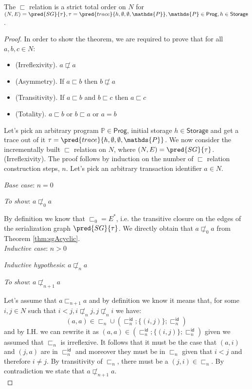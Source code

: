 \thm The $\sqsubset$ relation is a strict total order on $N$ for $(N, E) = \pred{SG}{\tau}, \tau = \pred{trace}{h, \emptyset, \emptyset, \mathds{P}}, \mathds{P} \in \mathsf{Prog}, h \in \mathsf{Storage}$.

\begin{proof}
In order to show the theorem, we are required to prove that for all $a, b, c \in N$:
\begin{itemize}
	\item (Irreflexivity). $a \not\sqsubset a$
	\item (Asymmetry). If $a \sqsubset b$ then $b \not\sqsubset a$
	\item (Transitivity). If $a \sqsubset b$ and $b \sqsubset c$ then $a \sqsubset c$
	\item (Totality). $a \sqsubset b$ or $b \sqsubset a$ or $a = b$
\end{itemize}

Let's pick an arbitrary program $\mathds{P} \in \mathsf{Prog}$, initial storage $h \in \mathsf{Storage}$ and get a trace out of it $\tau = \pred{trace}{h, \emptyset, \emptyset, \mathds{P}}$. We now consider the incrementally built $\sqsubset$ relation on $N$, where $(N, E) = \pred{SG}{\tau}$. \\

(Irreflexivity). The proof follows by induction on the number of $\sqsubset$ relation construction steps, $n$. Let's pick an arbitrary transaction identifier $a \in N$.

{\parindent0pt
\textit{Base case}: $n = 0$

\textit{To show}: $a \not\sqsubset_0 a$

By definition we know that $\sqsubset_0 = E^*$, i.e. the transitive closure on the edges of the serialization graph $\pred{SG}{\tau}$. We directly obtain that $a \not\sqsubset_0 a$ from Theorem \ref{thm:sgAcyclic}. \\

\textit{Inductive case}: $n > 0$

\textit{Inductive hypothesis}: $a \not\sqsubset_n a$

\textit{To show}: $a \not\sqsubset_{n+1} a$

Let's assume that $a \sqsubset_{n+1} a$ and by definition we know it means that, for some $i, j \in N$ such that $i < j, i \not\sqsubset_n j, j \not\sqsubset_n i$ we have:
\[
	(a, a) \in \sqsubset_n \cup \left( \sqsubset_n^\mathsf{id} ; \{ (i, j) \} ; \sqsubset_n ^\mathsf{id} \right)
\]
and by I.H. we can rewrite it as $(a, a) \in \left( \sqsubset_n^\mathsf{id} ; \{ (i, j) \} ; \sqsubset_n ^\mathsf{id} \right)$ given we assumed that $\sqsubset_n$ is irreflexive. It follows that it must be the case that $(a, i)$ and $(j, a)$ are in $\sqsubset_n^\mathsf{id}$ and moreover they must be in $\sqsubset_n$ given that $i < j$ and therefore $i \neq j$. By transitivity of $\sqsubset_n$, there must be a $(j, i) \in \sqsubset_n$. By contradiction we state that $a \not\sqsubset_{n+1} a$. \\
}


\end{proof}
